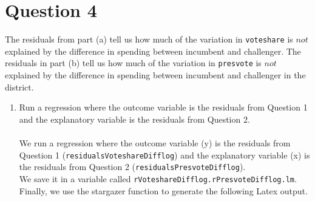 \documentclass[12pt,letterpaper]{article}
\begin{document}
\section*{Question 4}
\noindent The residuals from part (a) tell us how much of the variation in \texttt{voteshare} is $not$ explained by the difference in spending between incumbent and challenger. The residuals in part (b) tell us how much of the variation in \texttt{presvote} is $not$ explained by the difference in spending between incumbent and challenger in the district.
	\begin{enumerate}
		\item Run a regression where the outcome variable is the residuals from Question 1 and the explanatory variable is the residuals from Question 2.	
\\\\
\noindent We run a regression where the outcome variable (y) is the residuals from Question 1 (\texttt{residualsVoteshareDifflog}) and the explanatory variable (x) is the residuals from Question 2 (\texttt{residualsPresvoteDifflog}). 
\\We save it in a variable called \texttt{rVoteshareDifflog.rPresvoteDifflog.lm}. Finally, we use the stargazer function to generate the following Latex output.


\end{enumerate}
\end{document}
